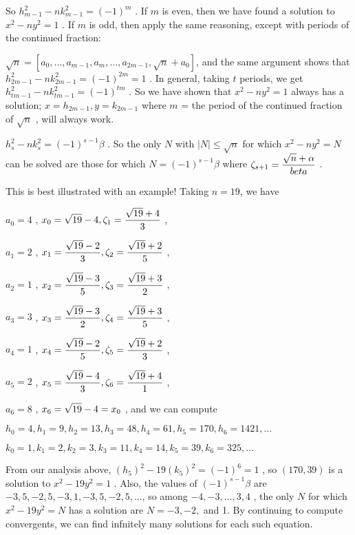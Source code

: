 So $h_{m-1}^2-nk_{m-1}^2 = (-1)^m$ . If $m$ is even, then we have found a solution to
$x^2-ny^2=1$ . If $m$ is odd, then apply the same reasoning, except with 
periods of the continued fraction: 

$\sqrt{n} = [a_0,\ldots,a_{m-1},a_m,\ldots,a_{2m-1},\sqrt{n}+a_0]$, and the same argument shows
that $h_{2m-1}^2-nk_{2m-1}^2 = (-1)^{2m} = 1$ . In general, taking $t$ periods, we get
$h_{tm-1}^2-nk_{tm-1}^2 = (-1)^{tm}$ . So we have shown that $x^2-ny^2=1$ always has a solution;
$x=h_{2m-1}, y=k_{2m-1}$ where $m$ = the period of the continued fraction of $\sqrt{n}$ , will
always work.




$h_s^2-nk_s^2 = (-1)^{s-1}\beta$ . So the only $N$ with $|N|\leq \sqrt{n}$ for which $x^2-ny^2=N$
can be solved are those for which $N = (-1)^{s-1}\beta$ where 
$\displaystyle \zeta_{s+1} = {{\sqrt{n}+\alpha}\over{beta}}$ . 

\msk

This is best illustrated with an example! Taking $n=19$, we have

$a_0=4$ , $\displaystyle x_0=\sqrt{19}-4, \zeta_1 = {{\sqrt{19}+4}\over{3}}$ , 

$a_1=2$ , $\displaystyle x_1={{\sqrt{19}-2}\over{3}}, \zeta_2 = {{\sqrt{19}+2}\over{5}}$ , 

$a_2=1$ , $\displaystyle x_2={{\sqrt{19}-3}\over{5}}, \zeta_3 = {{\sqrt{19}+3}\over{2}}$ ,

$a_3=3$ , $\displaystyle x_3={{\sqrt{19}-3}\over{2}}, \zeta_4 = {{\sqrt{19}+3}\over{5}}$ ,

$a_4=1$ , $\displaystyle x_4={{\sqrt{19}-2}\over{5}}, \zeta_5 = {{\sqrt{19}+2}\over{3}}$ ,

$a_5=2$ , $\displaystyle x_5={{\sqrt{19}-4}\over{3}}, \zeta_6 = {{\sqrt{19}+4}\over{1}}$ ,

$a_6=8$ , $\displaystyle x_6=\sqrt{19}-4 = x_0$ , and we can compute

\ssk

$h_0=4, h_1=9, h_2=13, h_3=48, h_4=61, h_5=170, h_6=1421, \ldots$

$k_0=1, k_1=2, k_2=3, k_3=11, k_4=14, k_5=39, k_6=325, \ldots$

\ssk

From our analysis above, $(h_5)^2-19(k_5)^2= (-1)^6=1$ , so
$(170,39)$ is a solution to $x^2-19y^2=1$ . Also, the values of $(-1)^{s-1}\beta$
are $-3, 5, -2, 5, -3, 1, -3, 5, -2, 5, \ldots$, so among $-4, -3, \ldots, 3, 4$ , the only $N$
for which $x^2-19y^2=N$ has a solution are $N=-3,-2,$ and 1.  By continuing to compute
convergents, we can find infnitely many solutions for each such equation.










